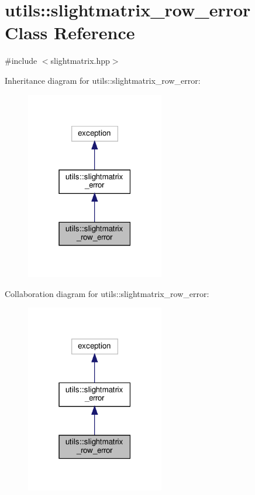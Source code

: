 \hypertarget{classutils_1_1slightmatrix__row__error}{}\section{utils\+:\+:slightmatrix\+\_\+row\+\_\+error Class Reference}
\label{classutils_1_1slightmatrix__row__error}


{\ttfamily \#include $<$slightmatrix.\+hpp$>$}



Inheritance diagram for utils\+:\+:slightmatrix\+\_\+row\+\_\+error\+:\nopagebreak
\begin{figure}[H]
\begin{center}
\leavevmode
\includegraphics[width=171pt]{classutils_1_1slightmatrix__row__error__inherit__graph}
\end{center}
\end{figure}


Collaboration diagram for utils\+:\+:slightmatrix\+\_\+row\+\_\+error\+:\nopagebreak
\begin{figure}[H]
\begin{center}
\leavevmode
\includegraphics[width=171pt]{classutils_1_1slightmatrix__row__error__coll__graph}
\end{center}
\end{figure}


